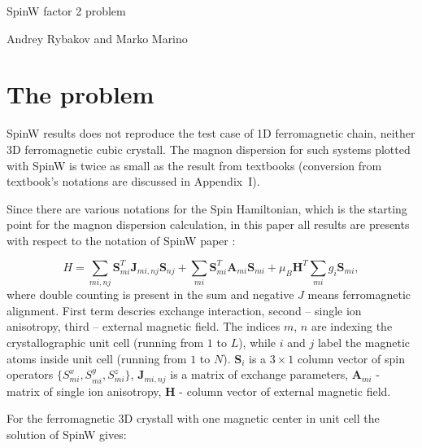 \documentclass[a4paper,12pt]{article}
\begin{document}
    \begin{center}
    \centering \LARGE SpinW factor 2 problem

    \vspace{1cm}
    \small Andrey Rybakov and Marko Marino
    \end{center}

    \section{The problem}

        SpinW \cite{SpinW} results does not reproduce the test case of 1D ferromagnetic chain, neither 3D ferromagnetic cubic crystall. 
        The magnon dispersion for such systems plotted with SpinW is twice as small as the result from textbooks 
        \cite{rezende2020fundamentals, blundell2003magnetism, gurevich1996magnetization, simon2013oxford, coey2010magnetism, jensen1991rare} (conversion from textbook's notations are discussed in Appendix~I). 

        Since there are various notations for the Spin Hamiltonian, which is the starting point for the magnon dispersion calculation, 
        in this paper all results are presents with respect to the notation of SpinW paper \cite{toth2015linear}:

        \begin{equation}
            H = \sum_{mi,nj}\boldsymbol{S}^T_{mi}\boldsymbol{J}_{mi, nj}\boldsymbol{S}_{nj} + 
            \sum_{mi}\boldsymbol{S}^T_{mi}\boldsymbol{A}_{mi}\boldsymbol{S}_{mi} + 
            \mu_B\boldsymbol{H}^T\sum_{mi}g_i\boldsymbol{S}_{mi},
        \end{equation}
        where double counting is present in the sum and negative $J$ means ferromagnetic alignment. 
        First term descries exchange interaction, second -- single ion anisotropy, third -- external magnetic field.
        The indices $m$, $n$ are indexing the crystallographic unit cell (running from $1$ to $L$), while $i$ and $j$ label the magnetic atoms inside unit cell (running from $1$ to $N$).
        $\boldsymbol{S}_i$ is a $3 \times 1$ column vector of spin operators $\{S_{mi}^x, S_{mi}^y, S_{mi}^z\}$, 
        $\boldsymbol{J}_{mi, nj}$ is a matrix of exchange parameters, $\boldsymbol{A}_{mi}$ - matrix of single ion anisotropy,  
        $\boldsymbol{H}$ - column vector of external magnetic field. 

        For the ferromagnetic 3D crystall with one magnetic center in unit cell the solution of SpinW gives:
\end{document}
